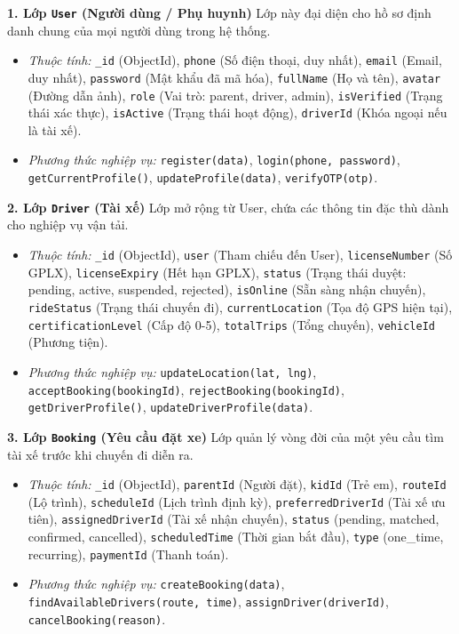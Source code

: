 \documentclass[../DoAn.tex]{subfiles}
\begin{document}
\textbf{1. Lớp \texttt{User} (Người dùng / Phụ huynh)}
Lớp này đại diện cho hồ sơ định danh chung của mọi người dùng trong hệ thống.
\begin{itemize}
    \item \textit{Thuộc tính:} \texttt{\_id} (ObjectId), \texttt{phone} (Số điện thoại, duy nhất), \texttt{email} (Email, duy nhất), \texttt{password} (Mật khẩu đã mã hóa), \texttt{fullName} (Họ và tên), \texttt{avatar} (Đường dẫn ảnh), \texttt{role} (Vai trò: parent, driver, admin), \texttt{isVerified} (Trạng thái xác thực), \texttt{isActive} (Trạng thái hoạt động), \texttt{driverId} (Khóa ngoại nếu là tài xế).
    \item \textit{Phương thức nghiệp vụ:} \texttt{register(data)}, \texttt{login(phone, password)}, \texttt{getCurrentProfile()}, \texttt{updateProfile(data)}, \texttt{verifyOTP(otp)}.
\end{itemize}

\textbf{2. Lớp \texttt{Driver} (Tài xế)}
Lớp mở rộng từ User, chứa các thông tin đặc thù dành cho nghiệp vụ vận tải.
\begin{itemize}
    \item \textit{Thuộc tính:} \texttt{\_id} (ObjectId), \texttt{user} (Tham chiếu đến User), \texttt{licenseNumber} (Số GPLX), \texttt{licenseExpiry} (Hết hạn GPLX), \texttt{status} (Trạng thái duyệt: pending, active, suspended, rejected), \texttt{isOnline} (Sẵn sàng nhận chuyến), \texttt{rideStatus} (Trạng thái chuyến đi), \texttt{currentLocation} (Tọa độ GPS hiện tại), \texttt{certificationLevel} (Cấp độ 0-5), \texttt{totalTrips} (Tổng chuyến), \texttt{vehicleId} (Phương tiện).
    \item \textit{Phương thức nghiệp vụ:} \texttt{updateLocation(lat, lng)}, \texttt{acceptBooking(bookingId)}, \texttt{rejectBooking(bookingId)}, \texttt{getDriverProfile()}, \texttt{updateDriverProfile(data)}.
\end{itemize}

\textbf{3. Lớp \texttt{Booking} (Yêu cầu đặt xe)}
Lớp quản lý vòng đời của một yêu cầu tìm tài xế trước khi chuyến đi diễn ra.
\begin{itemize}
    \item \textit{Thuộc tính:} \texttt{\_id} (ObjectId), \texttt{parentId} (Người đặt), \texttt{kidId} (Trẻ em), \texttt{routeId} (Lộ trình), \texttt{scheduleId} (Lịch trình định kỳ), \texttt{preferredDriverId} (Tài xế ưu tiên), \texttt{assignedDriverId} (Tài xế nhận chuyến), \texttt{status} (pending, matched, confirmed, cancelled), \texttt{scheduledTime} (Thời gian bắt đầu), \texttt{type} (one\_time, recurring), \texttt{paymentId} (Thanh toán).
    \item \textit{Phương thức nghiệp vụ:} \texttt{createBooking(data)}, \texttt{findAvailableDrivers(route, time)}, \texttt{assignDriver(driverId)}, \texttt{cancelBooking(reason)}.
\end{itemize}
\end{document}

